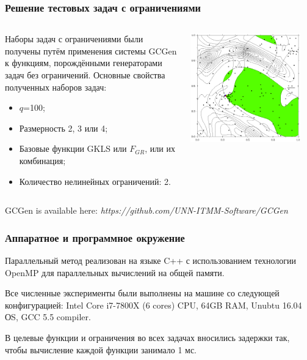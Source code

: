 \documentclass[aspectratio=1610]{beamer}
\begin{document}
\begin{frame}
  \frametitle{Решение тестовых задач с ограничениями}
  \begin{columns}
    \begin{column}{0.5\textwidth}
      Наборы задач с ограничениями были получены путём применения системы
      GCGen к функциям, порождёнными генераторами задач без ограничений.
      Основные свойства полученных наборов задач:
      \begin{itemize}
        \item \(q\)=100;
        \item Размерность 2, 3 или 4;
        \item Базовые функции GKLS или \(F_{GR}\), или их комбинация;
        \item Количество нелинейных ограничений: 2.
      \end{itemize}
    \end{column}
    \begin{column}{0.5\textwidth}
      \centerline{\includegraphics[width=0.9\textwidth]{4.png}}
    \end{column}
  \end{columns}
  \footnotesize{GCGen is available here: \textit{https://github.com/UNN-ITMM-Software/GCGen}}
\end{frame}

\begin{frame}
  \frametitle{Аппаратное и программное окружение}
  \begin{center}
    Параллельный метод реализован на языке C++ с использованием технологии OpenMP
    для параллельных вычислений на общей памяти.

    Все численные эксперименты были выполнены на машине со следующей конфигурацией:
    Intel Core i7-7800X (6 cores) CPU, 64GB RAM, Unubtu 16.04 ОS, GCC 5.5 compiler.
    
    В целевые функции и ограничения во всех задачах вносились задержки так, чтобы
    вычисление каждой функции занимало 1 мс.
  \end{center}
\end{frame}
\end{document}
